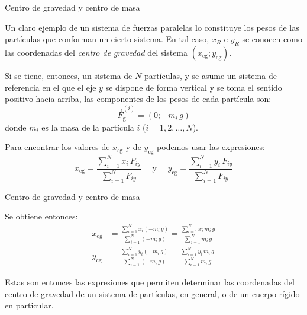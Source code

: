 \documentclass[11pt,handout,aspectratio=1610]{beamer}
\newcommand{\vs}{\vspace{11pt}}
\begin{document}
\begin{frame}{Centro de gravedad y centro de masa}

    Un claro ejemplo de un sistema de fuerzas paralelas lo constituye los pesos de las partículas que conforman un cierto sistema. En tal caso, $x_R$ e $y_R$ se conocen como las coordenadas del \emph{centro de gravedad} del sistema $\left(x_\text{cg}; y_\text{cg}\right)$.
    
    \vs

    Si se tiene, entonces, un sistema de $N$ partículas, y se asume un sistema de referencia en el que el eje $y$ se dispone de forma vertical y se toma el sentido positivo hacia arriba, las componentes de los pesos de cada partícula son: $$\vec{F}_{\text{g}}^{(i)} = \left(0; - m_i \, g\right)$$ donde $m_i$ es la masa de la partícula $i$ ($i = 1, 2, \ldots, N$). 

    \vs

    Para encontrar los valores de $x_\text{cg}$ y de $y_\text{cg}$ podemos usar las expresiones: $$ x_\text{cg} = \frac{\sum\limits_{i=1}^{N} x_i \, F_{iy}}{\sum\limits_{i=1}^{N} F_{iy}} \quad \text{ y } \quad y_\text{cg} = \frac{\sum\limits_{i=1}^{N} y_i \, F_{iy}}{\sum\limits_{i=1}^{N} F_{iy}} $$
    
\end{frame}

\begin{frame}{Centro de gravedad y centro de masa}

    Se obtiene entonces: 
    \begin{align*}
        x_\text{cg} &= \frac{\sum\limits_{i=1}^{N} x_i \left(- m_i \, g\right)}{\sum\limits_{i=1}^{N} \left(- m_i \, g\right)} = \frac{\sum\limits_{i=1}^{N} x_i \, m_i \, g}{\sum\limits_{i=1}^{N} m_i \, g} \\
        y_\text{cg} &= \frac{\sum\limits_{i=1}^{N} y_i \left(- m_i \, g\right)}{\sum\limits_{i=1}^{N} \left(- m_i \, g\right)} = \frac{\sum\limits_{i=1}^{N} y_i \, m_i \, g}{\sum\limits_{i=1}^{N} m_i \, g} 
    \end{align*}
    
    Estas son entonces las expresiones que permiten determinar las coordenadas del centro de gravedad de un sistema de partículas, en general, o de un cuerpo rígido en particular.
    
\end{frame}
\end{document}
